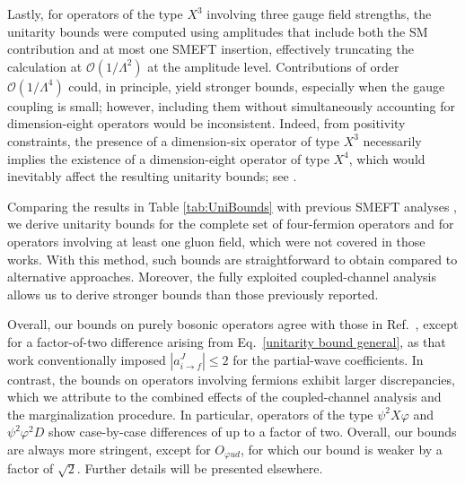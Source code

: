 \documentclass[
aps,
prd,
10pt,
twocolumn,
oneside,
preprintnumbers,
superscriptaddress,
amsmath,
amssymb,
nofootinbib,
flushbottom]{revtex4-2}
\begin{document}
Lastly, for operators of the type $X^3$ involving three gauge field strengths, the unitarity bounds were computed using amplitudes that include both the SM contribution and at most one SMEFT insertion, effectively truncating the calculation at $\mathcal{O}(1/\Lambda^2)$ at the amplitude level. 
Contributions of order $\mathcal{O}(1/\Lambda^4)$ could, in principle, yield stronger bounds, especially when the gauge coupling is small; however, including them without simultaneously accounting for dimension-eight operators would be inconsistent.
Indeed, from positivity constraints, the presence of a dimension-six operator of type $X^3$ necessarily implies the existence of a dimension-eight operator of type $X^4$, which would inevitably affect the resulting unitarity bounds; see \cite{Ghosh:2022qqq}.

Comparing the results in Table \ref{tab:UniBounds} with previous SMEFT analyses \cite{Corbett:2014ora,Corbett:2017qgl,Cao:2023qks}, we derive unitarity bounds for the complete set of four-fermion operators and for operators involving at least one gluon field, which were not covered in those works.
With this method, such bounds are straightforward to obtain compared to alternative approaches. Moreover, the fully exploited coupled-channel analysis allows us to derive stronger bounds than those previously reported. 

Overall, our bounds on purely bosonic operators agree with those in Ref.~\cite{Cao:2023qks}, except for a factor-of-two difference arising from Eq.~\eqref{unitarity bound general}, as that work conventionally imposed $|a_{i\to f}^J|\leq 2$ for the partial-wave coefficients. In contrast, the bounds on operators involving fermions exhibit larger discrepancies, which we attribute to the combined effects of the coupled-channel analysis and the marginalization procedure. In particular, operators of the type $\psi^2 X\varphi$ and $\psi^2\varphi^2 D$ show case-by-case differences of up to a factor of two. Overall, our bounds are always more stringent, except for $O_{\varphi ud}$, for which our bound is weaker by a factor of $\sqrt{2}$. Further details will be presented elsewhere.
\end{document}
